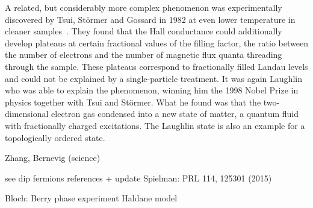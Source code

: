 A related, but considerably more complex phenomenon was experimentally discovered by Tsui, Störmer and Gossard in 1982 at even lower temperature in cleaner samples~\cite{Tsui1982}.
They found that the Hall conductance could additionally develop plateaus at certain fractional values of the filling factor, the ratio between the number of electrons and the number of magnetic flux quanta threading through the sample.
These plateaus correspond to fractionally filled Landau levels and could not be explained by a single-particle treatment.
It was again Laughlin who was able to explain the phenomenon, winning him the 1998 Nobel Prize in physics together with Tsui and Störmer.
What he found was that the two-dimensional electron gas condensed into a new state of matter, a quantum fluid with fractionally charged excitations.
The Laughlin state is also an example for a topologically ordered state.

\cite{Willett1987}

\cite{Haldane1988}

\cite{Kitaev2003}

\cite{Kane2005a,Kane2005,Hasan2010}

Zhang, Bernevig (science)



see dip fermions references + update
Spielman: PRL 114, 125301 (2015)

\cite{Aidelsburger2011,Aidelsburger2013,Miyake2013}

Bloch: Berry phase experiment
Haldane model \cite{Jotzu2014}




